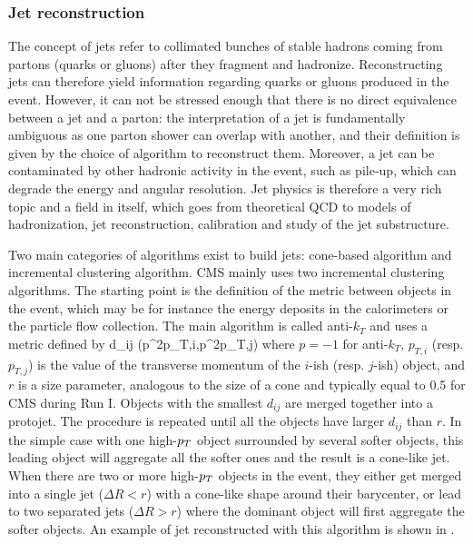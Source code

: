         \subsubsection{Jet reconstruction \label{sec:jetReconstruction}}

        The concept of jets refer to collimated bunches of stable hadrons coming from partons
        (quarks or gluons) after they fragment and hadronize. Reconstructing jets can
        therefore yield information regarding quarks or gluons produced in the event.
        However, it can not be stressed enough that there is no direct equivalence between
        a jet and a parton: the interpretation of a jet is fundamentally ambiguous as one
        parton shower can overlap with another, and their definition is given by the choice
        of algorithm to reconstruct them. Moreover, a jet can be contaminated by other
        hadronic activity in the event, such as pile-up, which can degrade the energy
        and angular resolution. Jet physics is therefore a very rich topic and a field
        in itself, which goes from theoretical QCD to models of hadronization, jet
        reconstruction, calibration and study of the jet substructure.

        Two main categories of algorithms exist to build jets: cone-based algorithm and
        incremental clustering algorithm. CMS mainly uses two incremental clustering
        algorithms. The starting point is the definition of the metric between objects in the
        event, which may be for instance the energy deposits in the calorimeters or the
        particle flow collection. The main algorithm is called anti-$k_T$ \cite{antiKt} and uses a metric
        defined by
        {
            d_{ij}  {}(p^{2p}_{T,i},p^{2p}_{T,j}) 
        }
        where $p = -1$ for anti-$k_T$, $p_{T,i}$ (resp. $p_{T,j}$) is the value of the transverse momentum of
        the $i$-ish (resp. $j$-ish) object, and $r$ is a size parameter, analogous to the size of a cone and
        typically equal to 0.5 for CMS during Run I. Objects with the smallest $d_{ij}$ are
        merged together into a protojet. The procedure is repeated until all the objects have
        larger $d_{ij}$ than $r$. In the
        simple case with one high-$p_T$ object surrounded by several softer objects, this
        leading object will aggregate all the softer ones and the result is a cone-like jet. When
        there are two or more high-$p_T$ objects in the event, they either get merged into
        a single jet ($\Delta R < r$) with a cone-like shape around their barycenter, or
        lead to two separated jets ($\Delta R > r$) where the dominant object will first
        aggregate the softer objects. An example of jet reconstructed with this algorithm
        is shown in .

